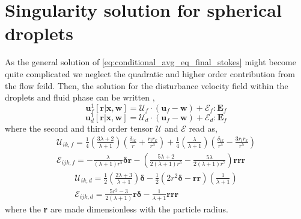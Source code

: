 
\section{Singularity solution for spherical droplets}


As the general solution of \ref{eq:conditional_avg_eq_final_stokes} might become quite complicated we neglect the quadratic and higher order contribution from the flow feild. 
Then, the solution for the disturbance velocity field within the droplets and fluid phase can be written \citep{leal2007advanced}, 
\begin{equation}
    \textbf{u}_f^1[\textbf{r}|\textbf{x},\textbf{w}]
    = 
    \mathcal{U}_f\cdot (\textbf{u}_f - \textbf{w})
    + \mathcal{E}_f: \textbf{E}_{f}
\end{equation}
\begin{equation}
    \textbf{u}_d^1[\textbf{r}|\textbf{x},\textbf{w}]
    = 
    \mathcal{U}_d\cdot (\textbf{u}_f - \textbf{w})
    + \mathcal{E}_d: \textbf{E}_{f}
\end{equation}
where the second and third order tensor $\mathcal{U}$ and $\mathcal{E}$ read as, 
\begin{align}
    \mathcal{U}_{ik,f} = 
    \frac{1}{4}\left(\frac{3\lambda + 2}{\lambda +1}\right)
    \left(\frac{\delta_{ik}}{r} + \frac{r_ir_k}{r^3}\right) 
    + 
    \frac{1}{4}\left(\frac{\lambda}{\lambda +1}\right)
    \left(\frac{\delta_{ik}}{r^3} - \frac{3r_ir_k}{r^5}\right)  \\
    \mathcal{E}_{ijk,f}
    =
    -\frac{\lambda}{(\lambda + 1)r^5} \bm\delta\textbf{r}
    -\left(\frac{5\lambda +2}{2(\lambda +1 )r^5} - \frac{5\lambda}{2(\lambda+1)r^7}\right) \textbf{rrr}
\end{align}
\begin{align}
    \mathcal{U}_{ik,d} = 
    \frac{1}{2}\left(\frac{2\lambda +3}{\lambda +1}\right)\bm\delta
    -\frac{1}{2} (2r^2 \bm\delta - \textbf{rr})
    \left(\frac{1}{\lambda +1}\right)\\
    \mathcal{E}_{ijk,d}
    =
    \frac{5r^2 -3}{2(\lambda +1)} \textbf{r}\bm\delta
    - \frac{1}{\lambda+1}\textbf{rrr}
\end{align}
where the \textbf{r} are made dimensionless with the particle radius. 


